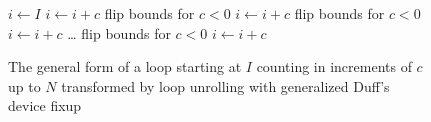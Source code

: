 \begin{figure}[H]
    \centering
    \begin{algorithmic}
        \State $i \gets I$
                \State {} 
                \State $i \gets i + c$ 
            \EndWhile
        \EndIf
             \Comment flip bounds for $c < 0$
                \State {}
                \State $i \gets i + c$ 
            \EndCase
             \Comment flip bounds for $c < 0$
                \State {}
                \State $i \gets i + c$ 
            \EndCase
            \State
            \ldots
             \Comment flip bounds for $c < 0$
                \State {}
                \State $i \gets i + c$
            \EndCase
        \EndSwitch
        \EndFunction
    \end{algorithmic}
    \caption{The general form of a loop starting at $I$ counting in increments of $c$ up to $N$ transformed by loop unrolling with generalized Duff's device fixup}
    \label{fig:impl:fixup:duff:general-loop}
\end{figure}